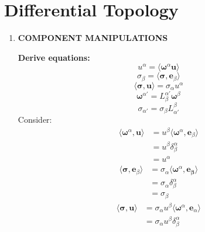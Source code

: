 \documentclass[9pt]{report}
\begin{document}
\chapter{Differential Topology}
\begin{enumerate}
  \item \textbf{COMPONENT MANIPULATIONS}

  \textbf{Derive equations:}
  \begin{equation}
    u^\alpha = \langle \boldsymbol{\omega}^\alpha \boldsymbol{u} \rangle
  \end{equation}
  \begin{equation}
    \sigma_\beta = \langle \boldsymbol{\sigma}, \boldsymbol{e}_\beta \rangle
  \end{equation}
  \begin{equation}
    \langle \boldsymbol{\sigma}, \boldsymbol{u} \rangle = \sigma_\alpha u^\alpha
  \end{equation}
  \begin{equation}
    \boldsymbol{\omega}^{\alpha'} = L^{\alpha'}_\beta \boldsymbol{\omega}^\beta
  \end{equation}
  \begin{equation}
    \sigma_{\alpha'} = \sigma_\beta L^\beta_{\alpha'}
  \end{equation}
  Consider:
  \[
    \begin{align}
      \langle \boldsymbol{\omega}^\alpha, \boldsymbol{u} \rangle &= u^\beta \langle \boldsymbol{\omega}^\alpha, \boldsymbol{e}_\beta \rangle \\
                                                                 &= u^\beta \delta^\alpha_\beta \\
                                                                 &= u^\alpha
    \end{align}
  \]
  \[
    \begin{align}
      \langle \boldsymbol{\sigma}, \boldsymbol{e}_\beta \rangle &= \sigma_\alpha \langle \boldsymbol{\omega}^\alpha, \boldsymbol{e_\beta} \rangle \\
      &= \sigma_\alpha \delta^\alpha_\beta \\
      &= \sigma_\beta
    \end{align}
  \]
  \[
  \]
  \[
    \begin{align}
      \langle \boldsymbol{\sigma}, \boldsymbol{u} \rangle &= \sigma_\alpha u^\beta \langle \boldsymbol{\omega}^\alpha, \boldsymbol{e}_\alpha \rangle\\
                                                          &= \sigma_\alpha u^\beta \delta^\alpha_\beta \\

\end{align}\]
\end{enumerate}
\end{document}

